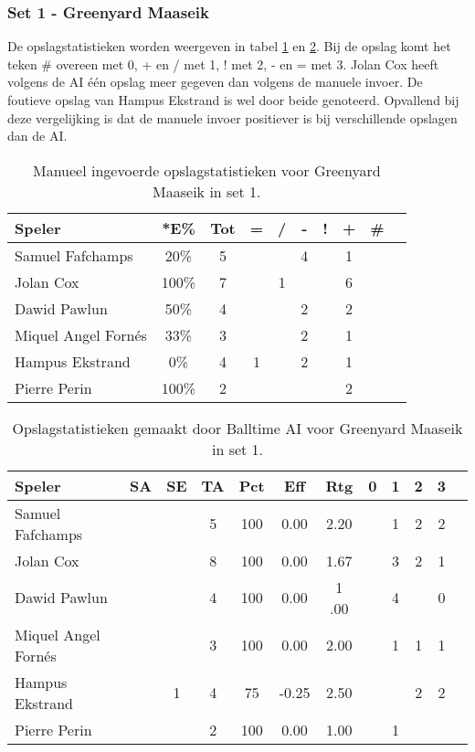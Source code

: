 \subsubsection{Set 1 - Greenyard Maaseik}
\label{sec:PL3_Greenyard1}

De opslagstatistieken worden weergeven in tabel \ref{tab:PL3ServeMaaseikMan1} en \ref{tab:PL3ServeMaaseikAI1}. Bij de opslag komt het teken \# overeen met 0, + en / met 1, ! met 2, - en = met 3.
Jolan Cox heeft volgens de AI één opslag meer gegeven dan volgens de manuele invoer. De foutieve opslag van Hampus Ekstrand is wel door beide genoteerd. Opvallend bij deze vergelijking is dat de manuele invoer positiever is bij verschillende opslagen dan de AI.

\begin{table}[ht!]
    \centering
    \scriptsize
    \begin{tabular}{|l|c|c|c|c|c|c|c|c|c|} \hline
        \textbf{Speler} & *E\% & Tot & = & / & - & ! & + & \# \\ \hline
        Samuel Fafchamps & 20\% & 5 &  & & 4 &  & 1 &  \\ 
        Jolan Cox & 100\% & 7 &  & 1 &  & & 6 &  \\ 
        Dawid Pawlun & 50\% & 4 &  &  & 2 & & 2 &  \\
        Miquel Angel Fornés & 33\% & 3 &  & & 2 &  & 1 &  \\
        Hampus Ekstrand & 0\% & 4 & 1 &  & 2 &  & 1 & \\ 
        Pierre Perin & 100\% & 2 &  &  &  & & 2 &  \\ \hline
    \end{tabular}
    \caption[Manueel ingevoerde opslagstatistieken voor Greenyard Maaseik in set 1]{\label{tab:PL3ServeMaaseikMan1}Manueel ingevoerde opslagstatistieken voor Greenyard Maaseik in set 1.}
\end{table}

\begin{table}[ht!]
  \centering
  \scriptsize
  \begin{tabular}{|l|c|c|c|c|c|c|c|c|c|c|c|} \hline
    \textbf{Speler} & SA & SE & TA & Pct & Eff & Rtg & 0 & 1 & 2 & 3 \\ \hline
    Samuel Fafchamps &  &  & 5 & 100 & 0.00 & 2.20 &   & 1 & 2 & 2 \\
    Jolan Cox &  &  & 8 & 100 & 0.00 & 1.67 &   & 3 & 2 & 1 \\
    Dawid Pawlun &  &  & 4 & 100 & 0.00 & 1 .00 &   & 4 &  & 0 \\
    Miquel Angel Fornés &  &  & 3 & 100 & 0.00 & 2.00 &  & 1 & 1 & 1 \\
    Hampus Ekstrand &  & 1 & 4 & 75 & -0.25 & 2.50 &   & & 2 & 2 \\
    Pierre Perin & & & 2 & 100 & 0.00 & 1.00 &   & 1 &   &  \\  \hline
  \end{tabular}
  \caption[Opslagstatistieken gemaakt door Balltime AI voor Greenyard Maaseik in set 1]{\label{tab:PL3ServeMaaseikAI1}Opslagstatistieken gemaakt door Balltime AI voor Greenyard Maaseik in set 1.}
\end{table}

